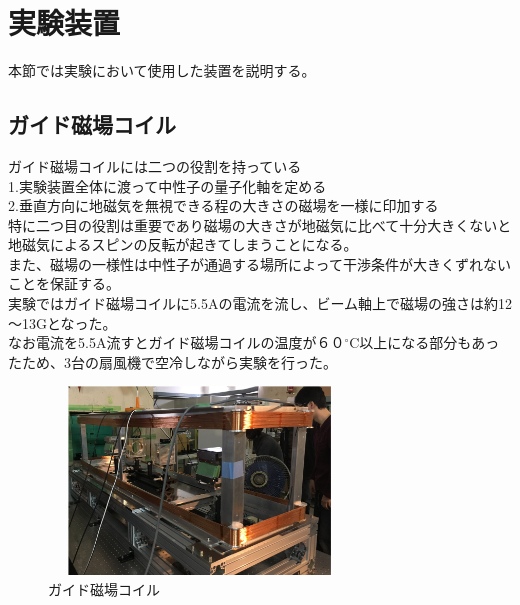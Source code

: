 
\section{実験装置}
本節では実験において使用した装置を説明する。
\subsection{ガイド磁場コイル}
ガイド磁場コイルには二つの役割を持っている\\
1.実験装置全体に渡って中性子の量子化軸を定める\\
2.垂直方向に地磁気を無視できる程の大きさの磁場を一様に印加する\\
特に二つ目の役割は重要であり磁場の大きさが地磁気に比べて十分大きくないと地磁気によるスピンの反転が起きてしまうことになる。\\
また、磁場の一様性は中性子が通過する場所によって干渉条件が大きくずれないことを保証する。\\
実験ではガイド磁場コイルに5.5Aの電流を流し、ビーム軸上で磁場の強さは約12～13Gとなった。\\
なお電流を5.5A流すとガイド磁場コイルの温度が６０$^\circ$C以上になる部分もあったため、3台の扇風機で空冷しながら実験を行った。
\begin{figure}[h]
\begin{center}
\includegraphics[width=8cm,height=5cm]{device/coilphoto.pdf}\caption{ガイド磁場コイル}
\end{center}
\end{figure}
